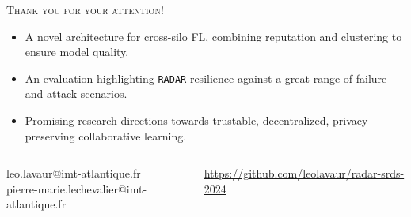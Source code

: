 \begin{frame}
  \centering\scshape\large Thank you for your attention!

  \vfill
  
  \normalshape\normalsize

  
  \raggedright
  \begin{itemize}
    \item A novel architecture for cross-silo FL, combining reputation and clustering to ensure model quality.
    \item An evaluation highlighting \texttt{RADAR} resilience against a great range of failure and attack scenarios.
    \item Promising research directions towards trustable, decentralized, privacy-preserving collaborative learning.
  \end{itemize}

  \vfill
  \begin{columns}
    \begin{column}{.5\textwidth}
      \centering\small
      leo.lavaur@imt-atlantique.fr\\
      pierre-marie.lechevalier@imt-atlantique.fr
    \end{column}

    \begin{column}{.5\textwidth}
      \centering\small
      \url{https://github.com/leolavaur/radar-srds-2024}
    \end{column}
  \end{columns}
\end{frame}



